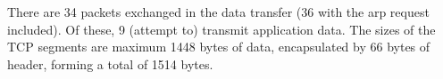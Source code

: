 There are 34 packets exchanged in the data transfer (36 with the arp request included). Of these, 9 (attempt to) transmit application data. The sizes of the TCP segments are maximum 1448 bytes of data, encapsulated by 66 bytes of header, forming a total of 1514 bytes.